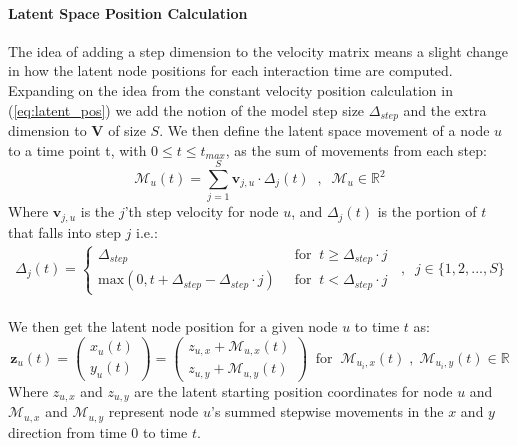 \paragraph{Latent Space Position Calculation}
\label{sec:Method:StepwiseLatentSpacePositions}
The idea of adding a step dimension to the velocity matrix means a slight change in how the latent node positions for each interaction time are computed. Expanding on the idea from the constant velocity position calculation in (\ref{eq:latent_pos}) we add the notion of the model step size $\Delta_{step}$ and the extra dimension to $\textbf{V}$ of size $S$. 
We then define the latent space movement of a node $u$ to a time point t, with $0 \le t \le t_{max}$, as the sum of movements from each step:
\begin{equation}
    \mathcal{M}_{u}(t) = \sum_{j = 1}^{S} \textbf{v}_{j, u} \cdot \Delta_{j}(t) \;\;,\;\; \mathcal{M}_{u} \in \mathbb{R}^2
    \label{eq:Method:ConstantVelocity:Movement}
\end{equation}
Where $\textbf{v}_{j,u}$ is the $j$'th step velocity for node $u$, and $\Delta_{j}(t)$ is the portion of $t$ that falls into step $j$ i.e.:
\begin{align}
    \Delta_{j}(t) = 
    \begin{cases}
        \Delta_{step} \;\; &\text{for} \;\; t \ge \Delta_{step} \cdot j\\
        \text{max}\left(0, t + \Delta_{step} - \Delta_{step} \cdot j\right) \;\; &\text{for} \;\; t < \Delta_{step} \cdot j
   \end{cases} \;\; , \;\; j \in \{1,2,...,S\}
   \label{eq:delta_t}
\end{align}
\\
We then get the latent node position for a given node $u$ to time $t$ as:
\begin{equation}
    \textbf{z}_{u}(t) = 
    \begin{pmatrix}
        x_{u}(t) \\
        y_{u}(t)
    \end{pmatrix}
    =
    \begin{pmatrix}
        z_{u,x} + \mathcal{M}_{u,x}(t) \\
        z_{u,y}+ \mathcal{M}_{u,y}(t)
    \end{pmatrix}
    \;\; \text{for} \;\; \mathcal{M}_{u_i,x}(t) \;,\; \mathcal{M}_{u_i,y}(t) \in \mathbb{R}
    \label{eq:Method:StepwiseConstantVelocity:latent_pos}
\end{equation}
Where $z_{u,x}$ and $z_{u,y}$ are the latent starting position coordinates for node $u$ and $\mathcal{M}_{u,x}$ and $\mathcal{M}_{u,y}$ represent node $u$'s summed stepwise movements in the $x$ and $y$ direction from time 0 to time $t$.


